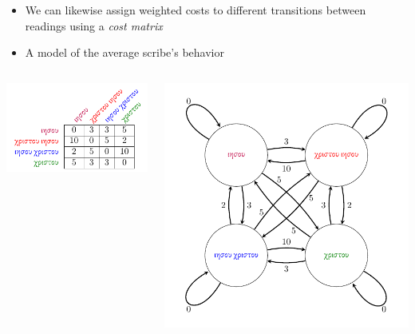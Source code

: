 \documentclass[10pt]{beamer}
\begin{document}
	\begin{frame}
		\begin{itemize}
			\item We can likewise assign weighted costs to different transitions between readings using a \emph{cost matrix}
			\item A model of the average scribe's behavior
		\end{itemize}
		\begin{center}
			\begin{columns}[T]
				\begin{column}{0.3\textwidth}
					\includegraphics[scale=0.6667]{../img/sankoff-cost-matrix.pdf}
				\end{column}
				\begin{column}{0.65\textwidth}
					\includegraphics[scale=0.6667]{../img/sankoff-cost-graph.pdf}
				\end{column}
			\end{columns}
		\end{center}
	\end{frame}
\end{document}
